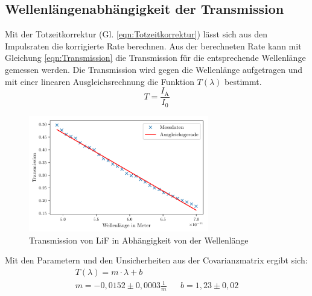 \subsection{Wellenlängenabhängigkeit der Transmission}
Mit der Totzeitkorrektur (Gl. \ref{eqn:Totzeitkorrektur}) lässt sich aus den Impulsraten die korrigierte Rate berechnen.
Aus der berechneten Rate kann mit Gleichung \ref{eqn:Transmission} die Transmission für die entsprechende Wellenlänge gemessen werden.
Die Transmission wird gegen die Wellenlänge aufgetragen und mit einer linearen Ausgleichsrechnung die Funktion $T(\lambda)$ bestimmt.
\begin{equation}
    T = \frac{I_{\text{A}}}{I_0} \label{eqn:Transmission}
\end{equation}
\begin{figure}[H]
    \centering
    \includegraphics[width=0.7\textwidth]{plots/Transmission.pdf}
    \caption{Transmission von LiF in Abhängigkeit von der Wellenlänge}
    \label{fig:Transmission}
\end{figure}
Mit den Parametern und den Unsicherheiten aus der Covarianzmatrix ergibt sich:
\begin{align*}
    T(\lambda) = m \cdot \lambda + b  \\
    m = -0,0152 \pm 0,0003 \frac{1}{m}&& b= 1,23 \pm 0,02 
\end{align*}

